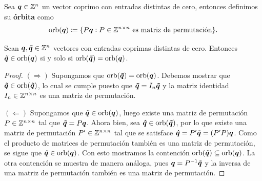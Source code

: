 \begin{definition}
	\label{def:orb}
	Sea $\boldsymbol{q} \in \mathbb{Z}^n$ un vector coprimo con entradas distintas de cero, entonces
	definimos su \textbf{órbita} como
	\begin{equation*}
		\operatorname{orb}(\boldsymbol{q}) \coloneq \lbrace P\boldsymbol{q} \vcentcolon P \in \mathbb{Z}^{n\times n} ~\text{es matriz de
		permutación} \rbrace.
	\end{equation*}
\end{definition}
\begin{lemma}
	\label{lemma:orb}
	Sean $\boldsymbol{q}, \boldsymbol{\tilde{q}} \in \mathbb{Z}^n$ vectores con entradas coprimas distintas de cero. Entonces
	$\boldsymbol{\tilde{q}} \in \operatorname{orb}(\boldsymbol{q})$ si y solo si $\operatorname{orb}(\boldsymbol{\tilde{q}}) = \operatorname{orb}(\boldsymbol{q})$.
\end{lemma}
\begin{proof}
	$(\Rightarrow)$ Supongamos que $\operatorname{orb}(\boldsymbol{\tilde{q}}) = \operatorname{orb}(\boldsymbol{q})$. Debemos mostrar que $\boldsymbol{\tilde{q}} \in
	\operatorname{orb}(\boldsymbol{\tilde{q}})$, lo cual se cumple puesto que $\boldsymbol{\tilde{q}} = I_n\boldsymbol{\tilde{q}}$ y la
	matriz identidad $I_n \in \mathbb{Z}^{n \times n}$ es una matriz de permutación.

	$(\Leftarrow)$ Supongamos que $\boldsymbol{\tilde{q}} \in \operatorname{orb}(\boldsymbol{q})$, luego existe una matriz de permutación $P \in \mathbb{Z}^{n\times
	n}$ tal que $\boldsymbol{\tilde{q}} = P\boldsymbol{q}$. Ahora bien, sea $\boldsymbol{\hat{q}} \in \operatorname{orb}(\boldsymbol{\tilde{q}})$, por lo
	que existe una matriz de permutación $P' \in \mathbb{Z}^{n\times n}$ tal que se satisface $\boldsymbol{\hat{q}} = P'\boldsymbol{\tilde{q}}
	= (P'P)\boldsymbol{q}$. Como el producto de matrices de permutación también es una matriz de
	permutación, se sigue que $\boldsymbol{\hat{q}} \in \operatorname{orb}(\boldsymbol{q})$. Con esto mostramos la contención
	$\operatorname{orb}(\boldsymbol{\tilde{q}}) \subseteq \operatorname{orb}(\boldsymbol{q})$. La otra contención se muestra de manera análoga, pues
	$\boldsymbol{q} = P^{-1}\boldsymbol{\tilde{q}}$ y la inversa de una matriz de permutación también es una matriz de
	permutación.
\end{proof}



